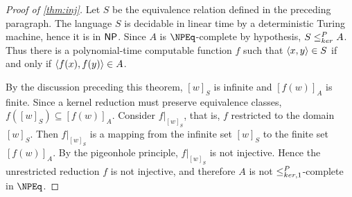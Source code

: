 \begin{proof}[Proof of \autoref{thm:inj}]
  Let $S$ be the equivalence relation defined in the preceding paragraph.
  The language $S$ is decidable in linear time by a deterministic Turing machine, hence it is in ${\mathsf{NP}}$.
  Since $A$ is $\NPEq$-complete by hypothesis, $S \leq^{P}_{ker} A$.
  Thus there is a polynomial-time computable function $f$ such that $\langle x,y\rangle \in S$ if and only if $\langle f(x),f(y)\rangle \in A$.

  By the discussion preceding this theorem, $[w]_S$ is infinite and $[f(w)]_A$ is finite.
  Since a kernel reduction must preserve equivalence classes, $f([w]_S) \subseteq [f(w)]_A$.
  Consider $f|_{[w]_S}$, that is, $f$ restricted to the domain $[w]_S$.
  Then $f|_{[w]_S}$ is a mapping from the infinite set $[w]_S$ to the finite set $[f(w)]_A$.
  By the pigeonhole principle, $f|_{[w]_S}$ is not injective.
  Hence the unrestricted reduction $f$ is not injective, and therefore $A$ is not $\leq^{P}_{ker,1}$-complete in $\NPEq$.
\end{proof}
